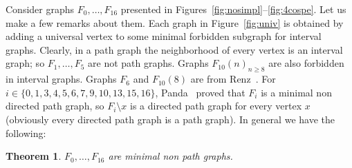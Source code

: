 \documentclass[11pt]{article}
\newtheorem{theorem}{Theorem}
\begin{document}
Consider graphs $F_0, \ldots, F_{16}$ presented in
Figures~\ref{fig:nosimpl}--\ref{fig:4cospe}.  Let us make a few
remarks about them.  Each graph in Figure~\ref{fig:univ} is obtained
by adding a universal vertex to some minimal forbidden subgraph for
interval graphs.  Clearly, in a path graph the neighborhood of every
vertex is an interval graph; so $F_1, \ldots, F_5$ are not path
graphs.  Graphs $F_{10}(n)_{n\geq 8}$ are also forbidden in interval
graphs.  Graphs $F_6$ and $F_{10}(8)$ are from Renz~\cite[Figures~1
and~5]{Ren70}.  For $i\in \{0, 1, 3, 4, 5, 6, 7, 9, 10, 13, 15, 16\}$,
Panda~\cite{Pan99} proved that $F_i$ is a minimal non directed path
graph, so $F_i\setminus x$ is a directed path graph for every vertex
$x$ (obviously every directed path graph is a path graph).  In general
we have the following:
\begin{theorem}
    \label{th:minimal}
    $F_0,\ldots,F_{16}$ are minimal non path graphs.
\end{theorem}
\end{document}
